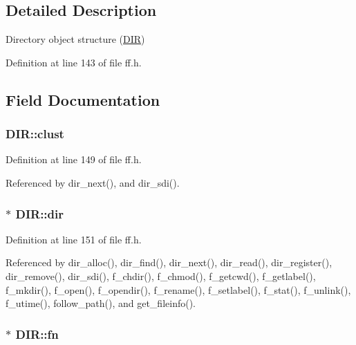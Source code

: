 \subsection{Detailed Description}
Directory object structure (\hyperlink{structDIR}{D\-I\-R}) 

Definition at line 143 of file ff.\-h.



\subsection{Field Documentation}
\hypertarget{structDIR_acfbb8ba2d6e73b6f999ceffd1857c190}{
\subsubsection[{clust}]{ D\-I\-R\-::clust}}\label{structDIR_acfbb8ba2d6e73b6f999ceffd1857c190}


Definition at line 149 of file ff.\-h.



Referenced by dir\-\_\-next(), and dir\-\_\-sdi().

\hypertarget{structDIR_a6c2a8c0cf2d55ae99775e93a16593449}{
\subsubsection[{dir}]{$\ast$ D\-I\-R\-::dir}}\label{structDIR_a6c2a8c0cf2d55ae99775e93a16593449}


Definition at line 151 of file ff.\-h.



Referenced by dir\-\_\-alloc(), dir\-\_\-find(), dir\-\_\-next(), dir\-\_\-read(), dir\-\_\-register(), dir\-\_\-remove(), dir\-\_\-sdi(), f\-\_\-chdir(), f\-\_\-chmod(), f\-\_\-getcwd(), f\-\_\-getlabel(), f\-\_\-mkdir(), f\-\_\-open(), f\-\_\-opendir(), f\-\_\-rename(), f\-\_\-setlabel(), f\-\_\-stat(), f\-\_\-unlink(), f\-\_\-utime(), follow\-\_\-path(), and get\-\_\-fileinfo().

\hypertarget{structDIR_a32da2f31d6c3b6c42eef981cb0cfd2ee}{
\subsubsection[{fn}]{$\ast$ D\-I\-R\-::fn}}\label{structDIR_a32da2f31d6c3b6c42eef981cb0cfd2ee}


